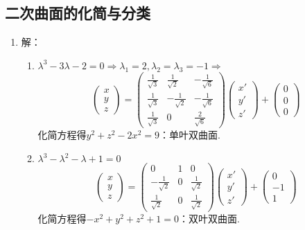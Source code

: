 \documentclass[UTF8]{ctexart}
\begin{document}
\subsection{二次曲面的化简与分类}
\begin{enumerate}

\item 解：\begin{enumerate}[(1)]
\item $\lambda^3-3\lambda-2=0\Rightarrow\lambda_1=2,\lambda_2=\lambda_3=-1\Rightarrow$
$$\left(\begin{array}{c}x\\y\\z\end{array}\right)=\left(\begin{array}{ccc}\displaystyle\frac{1}{\sqrt{3}}&\displaystyle\frac{1}{\sqrt{2}}&\displaystyle-\frac{1}{\sqrt{6}}\\\displaystyle\frac{1}{\sqrt{3}}&\displaystyle-\frac{1}{\sqrt{2}}&\displaystyle-\frac{1}{\sqrt{6}}\\\displaystyle\frac{1}{\sqrt{3}}&0&\displaystyle\frac{2}{\sqrt{6}}\end{array}\right)\left(\begin{array}{c}x'\\y'\\z'\end{array}\right)+\left(\begin{array}{c}0\\0\\0\end{array}\right)$$
化简方程得$y^2+z^2-2x^2=9$：单叶双曲面.

\item $\lambda^3-\lambda^2-\lambda+1=0$
$$\left(\begin{array}{c}x\\y\\z\end{array}\right)=\left(\begin{array}{ccc}0&1&0\\\displaystyle-\frac{1}{\sqrt{2}}&0&\displaystyle\frac{1}{\sqrt{2}}\\\displaystyle\frac{1}{\sqrt{2}}&0&\displaystyle\frac{1}{\sqrt{2}}\end{array}\right)\left(\begin{array}{c}x'\\y'\\z'\end{array}\right)+\left(\begin{array}{c}0\\-1\\1\end{array}\right)$$
化简方程得$-x^2+y^2+z^2+1=0$：双叶双曲面.


\end{enumerate}
\end{enumerate}
\end{document}
